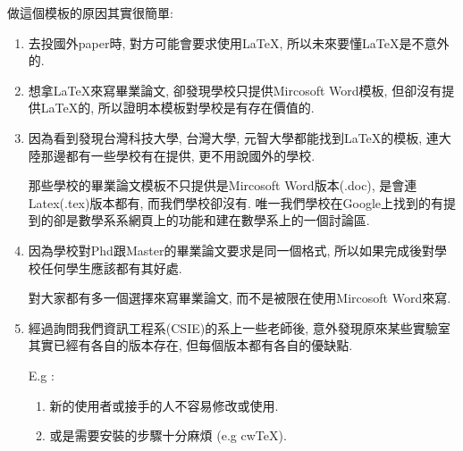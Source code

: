 

做這個模板的原因其實很簡單:

\begin{enumerate}
  \item
  {
    去投國外paper時, 對方可能會要求使用LaTeX, 所以未來要懂LaTeX是不意外的.
  } %

  \item
  {
    想拿LaTeX來寫畢業論文, 卻發現學校只提供Mircosoft Word模板, 但卻沒有提供LaTeX的, 所以證明本模板對學校是有存在價值的.
  } %

  \item
  {
    因為看到發現台灣科技大學, 台灣大學, 元智大學都能找到LaTeX的模板, 連大陸那邊都有一些學校有在提供, 更不用說國外的學校.

    那些學校的畢業論文模板不只提供是Mircosoft Word版本(.doc), 是會連Latex(.tex)版本都有, 而我們學校卻沒有. 唯一我們學校在Google上找到的有提到的卻是數學系系網頁上的功能和建在數學系上的一個討論區.
  } %

  \item
  {
    因為學校對Phd跟Master的畢業論文要求是同一個格式, 所以如果完成後對學校任何學生應該都有其好處.

    對大家都有多一個選擇來寫畢業論文, 而不是被限在使用Mircosoft Word來寫.
  } %

  \item
  {
    經過詢問我們資訊工程系(CSIE)的系上一些老師後, 意外發現原來某些實驗室其實已經有各自的版本存在, 但每個版本都有各自的優缺點.

    E.g :
    \begin{enumerate}

      \item
      {
        新的使用者或接手的人不容易修改或使用.
      } %

      \item
      {
        或是需要安裝的步驟十分麻煩 (e.g cwTeX).
      } %


\end{enumerate}}
\end{enumerate}

